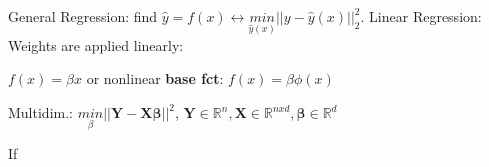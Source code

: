 General Regression: find $\hat{y} = f(x) \leftrightarrow \underset{\hat{y}(x)}{min} ||y - \hat{y}(x)||_2^2$.
Linear Regression: Weights are applied linearly:

$f(x) = \beta x$ or nonlinear \textbf{base fct}: $f(x) = \beta\phi(x)$

Multidim.: $\underset{\beta}{min}||\boldsymbol{Y-X\beta||}^2$, $\boldsymbol{Y} \in \mathbb{R}^n, \boldsymbol{X} \in \mathbb{R}^{nxd},\boldsymbol{\beta} \in \mathbb{R}^d$

If 
